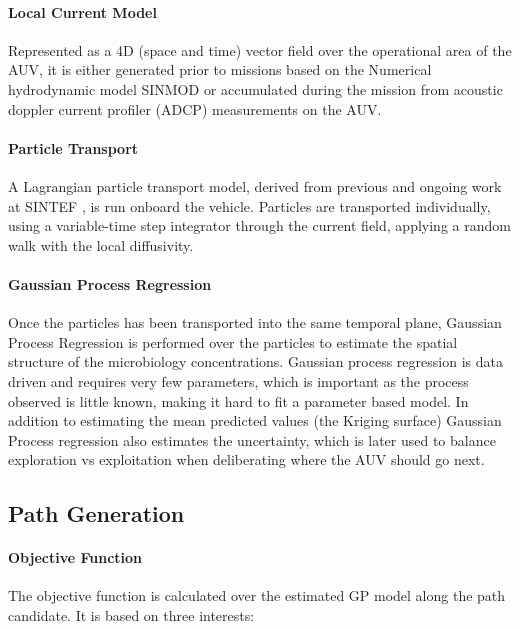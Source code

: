 \documentclass[conference]{IEEEtran}
\newcommand{\cmt}[1]{{\color{red}{#1}}}
\begin{document}
\paragraph{Local Current Model}
Represented as a 4D (space and time) vector field over the operational area of the AUV, it is either generated prior to missions based on the Numerical hydrodynamic model SINMOD \cite{slagstad2005} or accumulated during the mission from acoustic doppler current
profiler (ADCP) measurements on the AUV.

\paragraph{Particle Transport}
A Lagrangian particle transport model, derived from previous and ongoing
work at SINTEF \cite{Rye2006}, is run onboard the vehicle.
Particles are transported individually, using a variable-time step
integrator \cite{Dormand1980} through the current field, applying a random walk with the local diffusivity.

\paragraph{Gaussian Process Regression} 
Once the particles has been transported into the same temporal plane, Gaussian Process Regression is performed over the particles to estimate the spatial structure of the microbiology concentrations.
Gaussian process regression is data driven and requires very few parameters, which is important as the process observed is little known, making it hard to fit a parameter based model.
In addition to estimating the mean predicted values (the Kriging surface)
Gaussian Process regression also estimates the uncertainty, which is
later used to balance exploration vs exploitation when deliberating
where the AUV should go next.

\subsection{Path Generation}

\paragraph{Objective Function}
The objective function is calculated over the estimated GP model along
the path candidate.  It is based on three interests:
\end{document}
